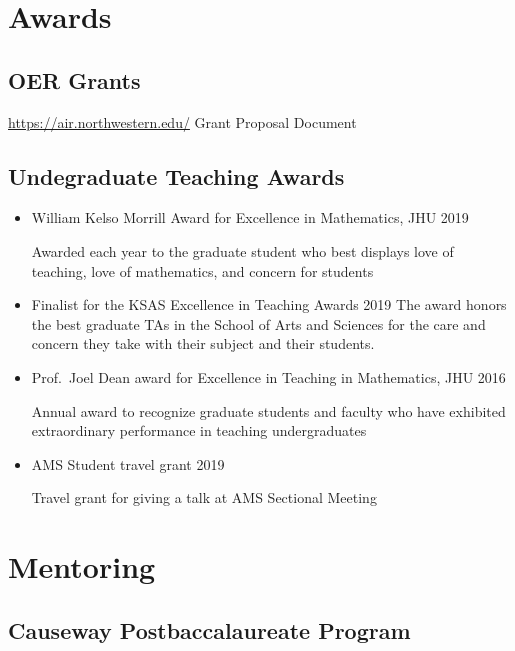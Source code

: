 \documentclass[
]{report}
\begin{document}
\hypertarget{awards}{%
\chapter{Awards}\label{awards}}

\hypertarget{oer-grants}{%
\section{OER Grants}\label{oer-grants}}

\url{https://air.northwestern.edu/}
Grant Proposal Document

\hypertarget{undegraduate-teaching-awards}{%
\section{Undegraduate Teaching Awards}\label{undegraduate-teaching-awards}}

\begin{itemize}
\item
  William Kelso Morrill Award for Excellence in Mathematics, JHU 2019

  Awarded each year to the graduate student who best displays love of teaching, love of mathematics, and concern for students
\item
  Finalist for the KSAS Excellence in Teaching Awards 2019
  The award honors the best graduate TAs in the School of Arts and Sciences for the care and concern they take with their subject and their students.
\item
  Prof.~Joel Dean award for Excellence in Teaching in Mathematics, JHU 2016

  Annual award to recognize graduate students and faculty who have exhibited extraordinary performance in teaching undergraduates
\item
  AMS Student travel grant 2019

  Travel grant for giving a talk at AMS Sectional Meeting
\end{itemize}

\hypertarget{mentoring}{%
\chapter{Mentoring}\label{mentoring}}

\hypertarget{causeway-postbaccalaureate-program}{%
\section{Causeway Postbaccalaureate Program}\label{causeway-postbaccalaureate-program}}
\end{document}
